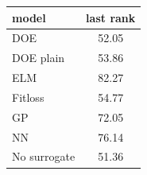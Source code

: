 \begin{tabular}{|lc|}
\hline
model & last rank\\
\hline
DOE & 52.05 \\
DOE plain & 53.86 \\
ELM & 82.27 \\
Fitloss & 54.77 \\
GP & 72.05 \\
NN & 76.14 \\
No surrogate & 51.36 \\
\hline
\end{tabular}
